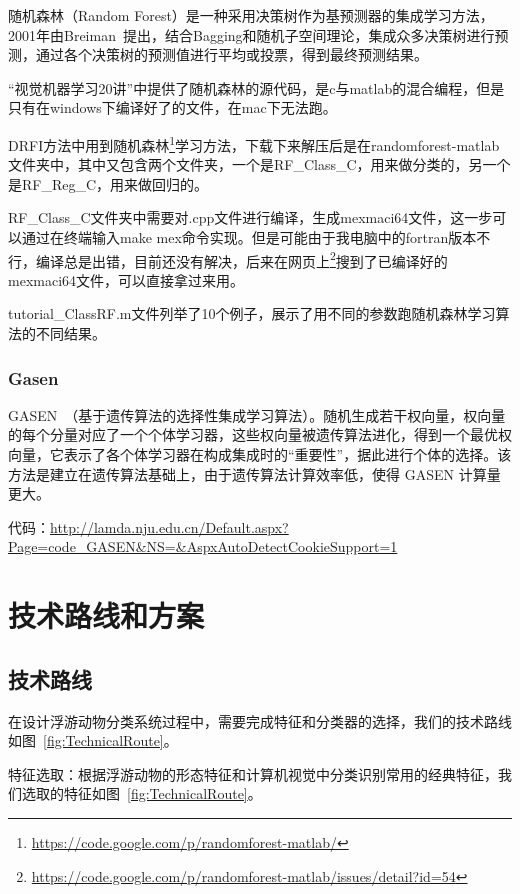 \documentclass[12pt]{article}
\begin{document}
随机森林（Random Forest）是一种采用决策树作为基预测器的集成学习方法，2001年由Breiman~\cite{breiman2001random}提出，结合Bagging和随机子空间理论，集成众多决策树进行预测，通过各个决策树的预测值进行平均或投票，得到最终预测结果。

“视觉机器学习20讲”中提供了随机森林的源代码，是c与matlab的混合编程，但是只有在windows下编译好了的文件，在mac下无法跑。

DRFI方法中用到随机森林\footnote{\url{https://code.google.com/p/randomforest-matlab/}}学习方法，下载下来解压后是在randomforest-matlab文件夹中，其中又包含两个文件夹，一个是RF\_Class\_C，用来做分类的，另一个是RF\_Reg\_C，用来做回归的。

RF\_Class\_C文件夹中需要对.cpp文件进行编译，生成mexmaci64文件，这一步可以通过在终端输入make mex命令实现。但是可能由于我电脑中的fortran版本不行，编译总是出错，目前还没有解决，后来在网页上\footnote{\url{https://code.google.com/p/randomforest-matlab/issues/detail?id=54}}搜到了已编译好的mexmaci64文件，可以直接拿过来用。

tutorial\_ClassRF.m文件列举了10个例子，展示了用不同的参数跑随机森林学习算法的不同结果。

\subsubsection{Gasen}

GASEN~\cite{zhou2002ensembling}（基于遗传算法的选择性集成学习算法）。随机生成若干权向量，权向量的每个分量对应了一个个体学习器，这些权向量被遗传算法进化，得到一个最优权向量，它表示了各个体学习器在构成集成时的“重要性”，据此进行个体的选择。该方法是建立在遗传算法基础上，由于遗传算法计算效率低，使得 GASEN 计算量更大。

{\color{blue}代码}：\url{http://lamda.nju.edu.cn/Default.aspx?Page=code_GASEN&NS=&AspxAutoDetectCookieSupport=1}

\section{技术路线和方案}

\subsection{技术路线}

在设计浮游动物分类系统过程中，需要完成特征和分类器的选择，我们的技术路线如图~\ref{fig:TechnicalRoute}。

特征选取：根据浮游动物的形态特征和计算机视觉中分类识别常用的经典特征，我们选取的特征如图~\ref{fig:TechnicalRoute}。
\end{document}
